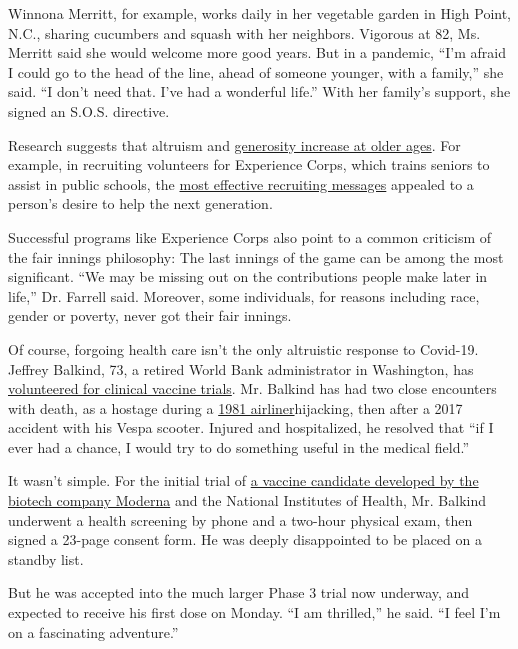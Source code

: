 Winnona Merritt, for example, works daily in her vegetable garden in
High Point, N.C., sharing cucumbers and squash with her neighbors.
Vigorous at 82, Ms. Merritt said she would welcome more good years. But
in a pandemic, ``I'm afraid I could go to the head of the line, ahead of
someone younger, with a family,'' she said. ``I don't need that. I've
had a wonderful life.'' With her family's support, she signed an S.O.S.
directive.

Research suggests that altruism and
\href{https://academic.oup.com/psychsocgerontology/article/74/1/52/3105859}{generosity
increase at older ages}. For example, in recruiting volunteers for
Experience Corps, which trains seniors to assist in public schools, the
\href{https://ajph.aphapublications.org/doi/full/10.2105/AJPH.2009.169151}{most
effective recruiting messages} appealed to a person's desire to help the
next generation.

Successful programs like Experience Corps also point to a common
criticism of the fair innings philosophy: The last innings of the game
can be among the most significant. ``We may be missing out on the
contributions people make later in life,'' Dr. Farrell said. Moreover,
some individuals, for reasons including race, gender or poverty, never
got their fair innings.

Of course, forgoing health care isn't the only altruistic response to
Covid-19. Jeffrey Balkind, 73, a retired World Bank administrator in
Washington, has
\href{https://www.coronaviruspreventionnetwork.org/}{volunteered for
clinical vaccine trials}. Mr. Balkind has had two close encounters with
death, as a hostage during a
\href{https://www.washingtonpost.com/archive/lifestyle/1994/09/23/amateur-chronicles-crisis/0a961fb6-af41-4857-8884-5bfc0a3511fd/}{1981
airliner}hijacking, then after a 2017 accident with his Vespa scooter.
Injured and hospitalized, he resolved that ``if I ever had a chance, I
would try to do something useful in the medical field.''

It wasn't simple. For the initial trial of
\href{https://www.nytimes3xbfgragh.onion/2020/07/27/health/moderna-vaccine-covid.html}{a
vaccine candidate developed by the biotech company Moderna} and the
National Institutes of Health, Mr. Balkind underwent a health screening
by phone and a two-hour physical exam, then signed a 23-page consent
form. He was deeply disappointed to be placed on a standby list.

But he was accepted into the much larger Phase 3 trial now underway, and
expected to receive his first dose on Monday. ``I am thrilled,'' he
said. ``I feel I'm on a fascinating adventure.''

